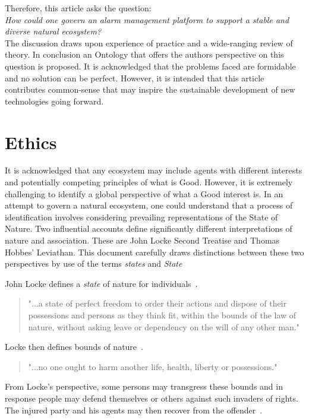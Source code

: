 \documentclass[11pt, oneside]{article}   	%
\begin{document}
Therefore, this article asks the question:\\

\emph{How could one govern an alarm management platform to support a stable and diverse natural ecosystem?}\\

The discussion draws upon experience of practice and a wide-ranging review of theory.
In conclusion an Ontology that offers the authors perspective on this question is proposed.
It is acknowledged that the problems faced are formidable and no solution can be perfect.
However, it is intended that this article contributes common-sense that may inspire the sustainable development of new technologies going forward.\


\section{Ethics}
It is acknowledged that any ecosystem may include agents with different interests and potentially competing principles of what is Good.
However, it is extremely challenging to identify a global perspective of what a Good interest is.
In an attempt to govern a natural ecosystem, one could understand that a process of identification involves considering prevailing representations of the State of Nature.
Two influential accounts define significantly different interpretations of nature and association.
These are John Locke Second Treatise and Thomas Hobbes' Leviathan.
This document carefully draws distinctions between these two perspectives by use of the terms \emph{states} and \emph{State}\

John Locke defines a \emph{state} of nature for individuals~\cite{jl1}.

\begin{quote}
"...a state of perfect freedom to order their actions and dispose of their possessions and persons as they think fit, within the bounds of the law of nature, without asking leave or dependency on the will of any other man."
\end{quote}

Locke then defines bounds of nature~\cite{jl1}.

\begin{quote}
"...no one ought to harm another life, health, liberty or possessions."
\end{quote}

From Locke's perspective, some persons may transgress these bounds and in response people may defend themselves or others against such invaders of rights.
The injured party and his agents may then recover from the offender~\cite{jl1}.
\end{document}
